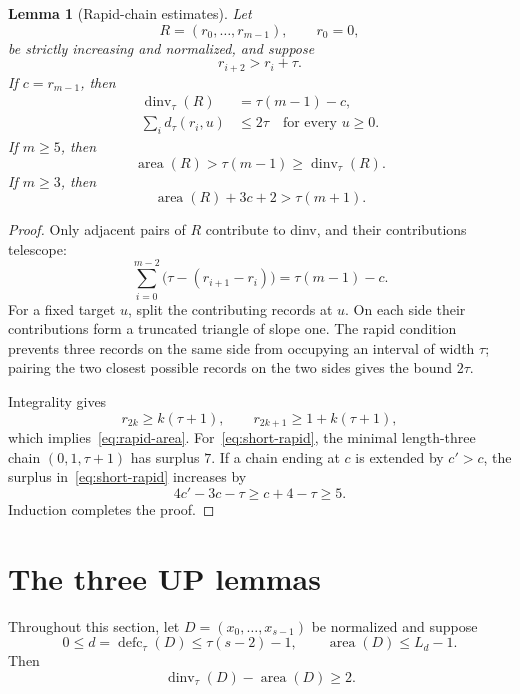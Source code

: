 \documentclass[11pt]{article}
\newtheorem{lemma}[theorem]{Lemma}
\theoremstyle{definition}
\theoremstyle{remark}
\newcommand{\area}{\operatorname{area}}
\newcommand{\dinv}{\operatorname{dinv}}
\newcommand{\defc}{\operatorname{defc}}
\begin{document}
\begin{lemma}[Rapid-chain estimates]
\label{lem:rapid}
Let
\[
  R=(r_0,\ldots,r_{m-1}),
  \qquad r_0=0,
\]
be strictly increasing and normalized, and suppose
\[
  r_{i+2}>r_i+\tau.
\]
If $c=r_{m-1}$, then
\begin{align}
 \dinv_\tau(R)&=\tau(m-1)-c,\label{eq:rapid-dinv}\\
 \sum_i d_\tau(r_i,u)&\le2\tau
 \quad\text{for every }u\ge0.\label{eq:rapid-target}
\end{align}
If $m\ge5$, then
\begin{equation}
  \area(R)>\tau(m-1)\ge\dinv_\tau(R).
  \label{eq:rapid-area}
\end{equation}
If $m\ge3$, then
\begin{equation}
  \area(R)+3c+2>\tau(m+1).
  \label{eq:short-rapid}
\end{equation}
\end{lemma}

\begin{proof}
Only adjacent pairs of $R$ contribute to dinv, and their contributions
 telescope:
\[
 \sum_{i=0}^{m-2}\bigl(\tau-(r_{i+1}-r_i)\bigr)
 =\tau(m-1)-c.
\]
For a fixed target $u$, split the contributing records at $u$.  On each side
their contributions form a truncated triangle of slope one.  The rapid
condition prevents three records on the same side from occupying an interval
of width $\tau$; pairing the two closest possible records on the two sides
gives the bound $2\tau$.

Integrality gives
\[
  r_{2k}\ge k(\tau+1),
  \qquad r_{2k+1}\ge1+k(\tau+1),
\]
which implies~\eqref{eq:rapid-area}.  For~\eqref{eq:short-rapid}, the minimal
length-three chain $(0,1,\tau+1)$ has surplus $7$.  If a chain ending at $c$
is extended by $c'>c$, the surplus in~\eqref{eq:short-rapid} increases by
\[
  4c'-3c-\tau\ge c+4-\tau\ge5.
\]
Induction completes the proof.
\end{proof}

\section{The three UP lemmas}

Throughout this section, let $D=(x_0,\ldots,x_{s-1})$ be normalized and
suppose
\begin{equation}
  0\le d=\defc_\tau(D)\le\tau(s-2)-1,
  \qquad \area(D)\le L_d-1.
  \label{eq:up-hyp}
\end{equation}
Then
\begin{equation}
  \dinv_\tau(D)-\area(D)\ge2.
  \label{eq:strict-lower-gap}
\end{equation}
\end{document}
